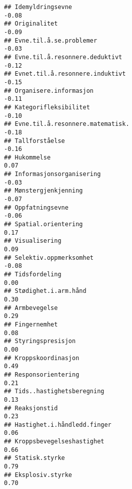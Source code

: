 \documentclass[
]{article}
\begin{document}
\begin{verbatim}
## Idemyldringsevne                                                                 -0.08
## Originalitet                                                                     -0.09
## Evne.til.å.se.problemer                                                          -0.03
## Evne.til.å.resonnere.deduktivt                                                   -0.12
## Evnet.til.å.resonnere.induktivt                                                  -0.15
## Organisere.informasjon                                                           -0.11
## Kategorifleksibilitet                                                            -0.10
## Evne.til.å.resonnere.matematisk.                                                 -0.18
## Tallforståelse                                                                   -0.16
## Hukommelse                                                                        0.07
## Informasjonsorganisering                                                         -0.03
## Mønstergjenkjenning                                                              -0.07
## Oppfatningsevne                                                                  -0.06
## Spatial.orientering                                                               0.17
## Visualisering                                                                     0.09
## Selektiv.oppmerksomhet                                                           -0.08
## Tidsfordeling                                                                     0.00
## Stødighet.i.arm.hånd                                                              0.30
## Armbevegelse                                                                      0.29
## Fingernemhet                                                                      0.08
## Styringspresisjon                                                                 0.00
## Kroppskoordinasjon                                                                0.49
## Responsorientering                                                                0.21
## Tids..hastighetsberegning                                                         0.13
## Reaksjonstid                                                                      0.23
## Hastighet.i.håndledd.finger                                                       0.06
## Kroppsbevegelseshastighet                                                         0.66
## Statisk.styrke                                                                    0.79
## Eksplosiv.styrke                                                                  0.70

\end{verbatim}
\end{document}
